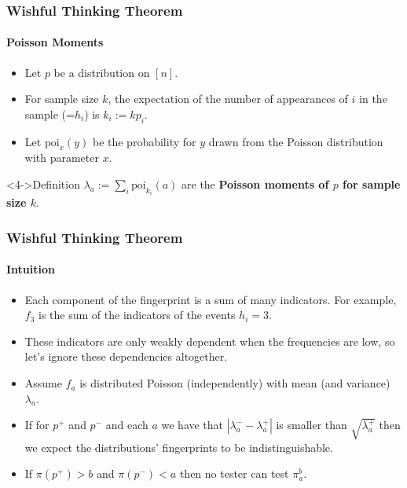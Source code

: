 \documentclass{beamer}
\begin{document}
\begin{frame}
  \frametitle{Wishful Thinking Theorem} \framesubtitle{Poisson
    Moments}

  \begin{block}{}
    
    \begin{itemize}
    \item<1-> Let $p$ be a distribution on $[n]$.
    \item<2-> For sample size $k$, the expectation of the number of
      appearances of $i$ in the sample (=$h_i$) is $k_i:=kp_i$.
    \item<3-> Let $\mbox{poi}_x(y)$ be the probability for $y$ drawn
      from the Poisson distribution with parameter $x$.
    \end{itemize}
  \end{block}
  \begin{block}<4->{Definition}
    $\lambda_a:=\sum_i\mbox{poi}_{k_i}(a)$ are the {\bf Poisson
      moments of $p$ for sample size $k$}.
  \end{block}
\end{frame}



\begin{frame}
  \frametitle{Wishful Thinking Theorem} \framesubtitle{Intuition}

  \begin{block}{}
    \begin{itemize}
    \item<1-> Each component of the fingerprint is a sum of many
      indicators. For example, $f_3$ is the sum of the indicators of
      the events $h_i=3$.
    \item<2-> These indicators are only weakly dependent when the
      frequencies are low, so let's ignore these dependencies
      altogether.
    \item<3-> Assume $f_a$ is distributed Poisson (independently) with mean
      (and variance) $\lambda_a$.
    \item<4-> If for $p^+$ and $p^-$ and each $a$ we have that
      $|\lambda^-_a-\lambda^+_a|$ is smaller than $\sqrt{\lambda^+_a}$
      then we expect the distributions' fingerprints to be
      indistinguishable.
    \item<5-> If $\pi(p^+)>b$ and $\pi(p^-)<a$ then no tester can test
      $\pi_a^b$.
    \end{itemize}
  \end{block}
\end{frame}
\end{document}
